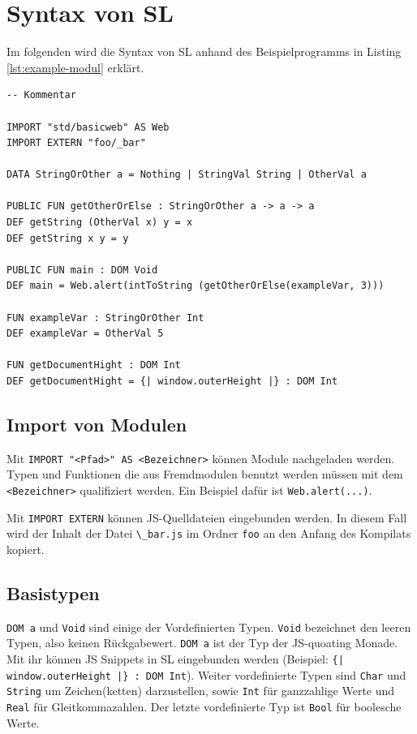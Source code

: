 \documentclass[12pt,bibtotoc]{scrreprt}
\begin{document}
\section{Syntax von SL}

Im folgenden wird die Syntax von SL anhand des Beispielprogramms in Listing \ref{lst:example-modul} erklärt.

\begin{lstlisting}[caption=Beispielmodul, label=lst:example-modul, float=h]
-- Kommentar

IMPORT "std/basicweb" AS Web
IMPORT EXTERN "foo/_bar"

DATA StringOrOther a = Nothing | StringVal String | OtherVal a

PUBLIC FUN getOtherOrElse : StringOrOther a -> a -> a
DEF getString (OtherVal x) y = x
DEF getString x y = y

PUBLIC FUN main : DOM Void
DEF main = Web.alert(intToString (getOtherOrElse(exampleVar, 3)))

FUN exampleVar : StringOrOther Int
DEF exampleVar = OtherVal 5

FUN getDocumentHight : DOM Int
DEF getDocumentHight = {| window.outerHeight |} : DOM Int

\end{lstlisting}

\subsection{Import von Modulen}

Mit \lstinline!IMPORT "<Pfad>" AS <Bezeichner>! können Module nachgeladen werden. Typen und Funktionen die aus Fremdmodulen benutzt werden müssen mit dem \lstinline!<Bezeichner>! qualifiziert werden. Ein Beispiel dafür ist \lstinline!Web.alert(...)!. 
  
  Mit \lstinline!IMPORT EXTERN! können \ac{JS}-Quelldateien eingebunden werden. In diesem Fall wird der Inhalt der Datei \lstinline!\_bar.js! im Ordner \lstinline!foo! an den Anfang des Kompilats kopiert.

\subsection{Basistypen}

\lstinline!DOM a! und \lstinline!Void! sind einige der Vordefinierten Typen. \lstinline!Void! bezeichnet den leeren Typen, also keinen Rückgabewert. \lstinline!DOM a! ist der Typ der \ac{JS}-quoating Monade. Mit ihr können \ac{JS} Snippets in \ac{SL} eingebunden werden (Beispiel: \lstinline!{| window.outerHeight |} : DOM Int!). Weiter vordefinierte Typen sind \lstinline!Char! und \lstinline!String! um Zeichen(ketten) darzustellen, sowie \lstinline!Int! für ganzzahlige Werte und \lstinline!Real! für Gleitkommazahlen. Der letzte vordefinierte Typ ist \lstinline!Bool! für boolesche Werte.
  
\end{document}
